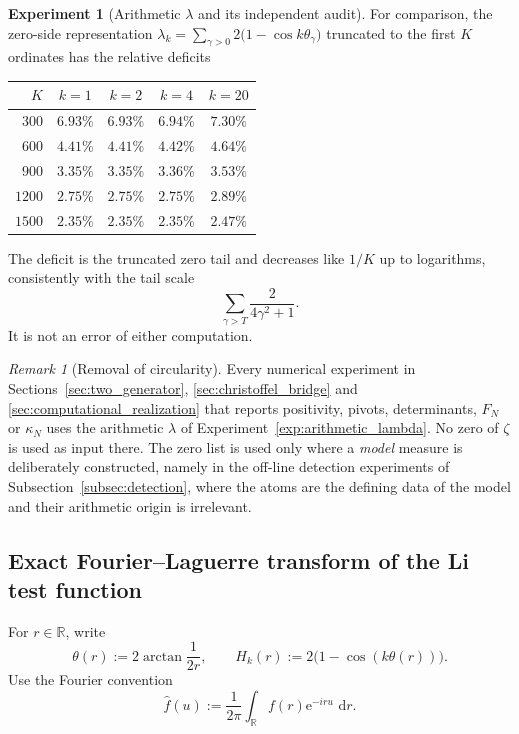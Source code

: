 \documentclass[11pt]{amsart}
\numberwithin{equation}{section}
\theoremstyle{plain}
\theoremstyle{definition}
\newtheorem{experiment}[theorem]{Experiment}
\theoremstyle{remark}
\newtheorem{remark}[theorem]{Remark}
\newcommand{\e}{\mathrm e}
\newcommand{\dd}{\,\mathrm d}
\begin{document}
\begin{experiment}[Arithmetic $\lambda$ and its independent audit]
For comparison, the zero-side representation
$\lambda_k=\sum_{\gamma>0}2\bigl(1-\cos k\theta_\gamma\bigr)$ truncated to the first $K$
ordinates has the relative deficits
\begin{center}
\small
\begin{tabular}{rcccc}
\toprule
$K$ & $k=1$ & $k=2$ & $k=4$ & $k=20$\\
\midrule
$300$  & $6.93\%$ & $6.93\%$ & $6.94\%$ & $7.30\%$\\
$600$  & $4.41\%$ & $4.41\%$ & $4.42\%$ & $4.64\%$\\
$900$  & $3.35\%$ & $3.35\%$ & $3.36\%$ & $3.53\%$\\
$1200$ & $2.75\%$ & $2.75\%$ & $2.75\%$ & $2.89\%$\\
$1500$ & $2.35\%$ & $2.35\%$ & $2.35\%$ & $2.47\%$\\
\bottomrule
\end{tabular}
\end{center}
The deficit is the truncated zero tail and decreases like $1/K$ up to logarithms, consistently with
the tail scale
\[
\sum_{\gamma>T}\frac{2}{4\gamma^2+1}.
\]
It is not an error of either computation.
\end{experiment}

\begin{remark}[Removal of circularity]
\label{rem:no_circularity}
Every numerical experiment in Sections~\ref{sec:two_generator},
\ref{sec:christoffel_bridge} and \ref{sec:computational_realization} that reports
positivity, pivots, determinants, $F_N$ or $\kappa_N$ uses the arithmetic $\lambda$ of
Experiment~\ref{exp:arithmetic_lambda}.  No zero of $\zeta$ is used as input there.  The
zero list is used only where a \emph{model} measure is deliberately constructed, namely in
the off-line detection experiments of
Subsection~\ref{subsec:detection}, where the atoms are the defining data of the model and
their arithmetic origin is irrelevant.
\end{remark}

\subsection{Exact Fourier--Laguerre transform of the Li test function}

For $r\in\mathbb R$, write
\begin{equation}
 \theta(r):=2\arctan\frac{1}{2r},
 \qquad
 H_k(r):=2\bigl(1-\cos(k\theta(r))\bigr).
 \label{eq:Hk_theta_definition}
\end{equation}
Use the Fourier convention
\begin{equation}
 \widehat f(u):=\frac{1}{2\pi}\int_{\mathbb R}f(r)\e^{-iru}\,\dd r.
 \label{eq:fourier_convention_laguerre}
\end{equation}
\end{document}

